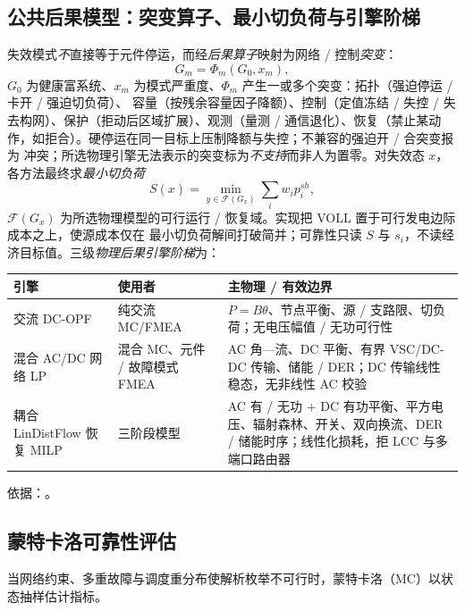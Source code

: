 \subsection{公共后果模型：突变算子、最小切负荷与引擎阶梯}\label{sec:rel-th-conseq}
失效模式\emph{不}直接等于元件停运，而经\emph{后果算子}映射为网络 / 控制\emph{突变}：
\begin{equation}
 G_m=\Phi_m(G_0,x_m),
\end{equation}
$G_0$ 为健康富系统、$x_m$ 为模式严重度、$\Phi_m$ 产生一或多个突变：拓扑（强迫停运 / 卡开 / 强迫切负荷）、
容量（按残余容量因子降额）、控制（定值冻结 / 失控 / 失去构网）、保护（拒动后区域扩展）、观测（量测 /
通信退化）、恢复（禁止某动作，如拒合）。硬停运在同一目标上压制降额与失控；不兼容的强迫开 / 合突变报为
冲突；所选物理引擎无法表示的突变标为\emph{不支持}而非人为置零。对失效态 $x$，各方法最终求\emph{最小切负荷}
\begin{equation}
 S(x)=\min_{y\in\mathcal F(G_x)}\sum_iw_ip_i^{sh},
 \label{eq:rel-th-minshed}
\end{equation}
$\mathcal F(G_x)$ 为所选物理模型的可行运行 / 恢复域。实现把 VOLL 置于可行发电边际成本之上，使源成本仅在
最小切负荷解间打破简并；可靠性只读 $S$ 与 $s_i$，不读经济目标值。三级\emph{物理后果引擎阶梯}为：
\begin{center}\footnotesize
\begin{tabular}{@{}L{2.9cm}L{3.4cm}L{7.3cm}@{}}
\toprule
引擎 & 使用者 & 主物理 / 有效边界\\
\midrule
交流 DC-OPF & 纯交流 MC/FMEA & $P{=}B\theta$、节点平衡、源 / 支路限、切负荷；无电压幅值 / 无功可行性\\
混合 AC/DC 网络 LP & 混合 MC、元件 / 故障模式 FMEA & AC 角—流、DC 平衡、有界 VSC/DC-DC 传输、储能 / DER；DC 传输线性稳态，无非线性 AC 校验\\
耦合 LinDistFlow 恢复 MILP & 三阶段模型 & AC 有 / 无功 $+$ DC 有功平衡、平方电压、辐射森林、开关、双向换流、DER / 储能时序；线性化损耗，拒 LCC 与多端口路由器\\
\bottomrule
\end{tabular}
\end{center}
依据：。

\subsection{蒙特卡洛可靠性评估}\label{sec:rel-th-mc}
当网络约束、多重故障与调度重分布使解析枚举不可行时，蒙特卡洛（MC）以状态抽样估计指标。

